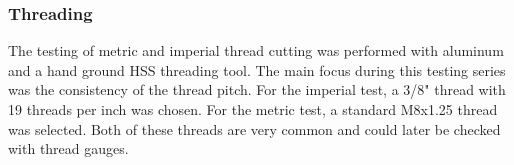 \subsubsection{Threading}
The testing of metric and imperial thread cutting was performed with aluminum and a hand ground HSS threading tool. The main focus during this testing series was the consistency of the thread pitch. For the imperial test, a 3/8" thread with 19 threads per inch was chosen. For the metric test, a standard M8x1.25 thread was selected. Both of these threads are very common and could later be checked with thread gauges.
 
 
 
 
 
 
 
 
 
 
 
 
 
 

